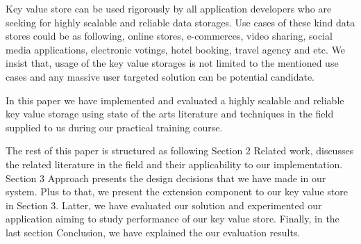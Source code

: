 \documentclass{sig-alternate}
\begin{document}
Key value store can be used rigorously by all application developers who are seeking for highly scalable and reliable data storages. Use cases of  these kind data stores could be as following, online stores, e-commerces, video sharing, social media applications, electronic votings, hotel booking, travel agency and etc. We insist that, usage of the key value storages is not limited to the mentioned use cases and any massive user targeted solution can be potential candidate.

In this paper we have implemented and evaluated a highly scalable and reliable  key value storage using state of the arts literature and  techniques in the field supplied to us during our practical training course. 

The rest of this paper is structured as following Section 2 Related work, discusses the related literature in the field and their applicability to our implementation. Section 3 Approach presents the design decisions that we have made in our system. Plus to that, we present the extension component to our key value store in Section 3. Latter, we have evaluated our solution and experimented our application aiming to study performance of our key value store.  Finally, in the last section Conclusion, we have explained the our evaluation results.

%
%
\end{document}
